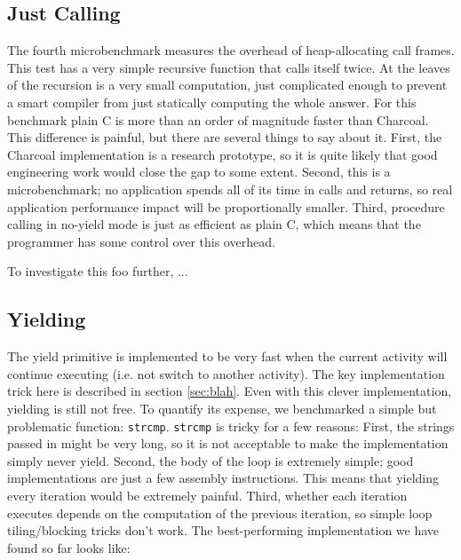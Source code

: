 \documentclass[10pt,preprint]{sigplanconf}
\begin{document}
\subsection{Just Calling}


The fourth microbenchmark measures the overhead of heap-allocating call frames.
This test has a very simple recursive function that calls itself twice.
At the leaves of the recursion is a very small computation, just complicated enough to prevent a smart compiler from just statically computing the whole answer.
For this benchmark plain C is more than an order of magnitude faster than Charcoal.
This difference is painful, but there are several things to say about it.
First, the Charcoal implementation is a research prototype, so it is quite likely that good engineering work would close the gap to some extent.
Second, this is a microbenchmark; no application spends all of its time in calls and returns, so real application performance impact will be proportionally smaller.
Third, procedure calling in no-yield mode is just as efficient as plain C, which means that the programmer has some control over this overhead.

To investigate this foo further, ...

\subsection{Yielding}

The yield primitive is implemented to be very fast when the current activity will continue executing (i.e. not switch to another activity).
The key implementation trick here is described in section \ref{sec:blah}.
Even with this clever implementation, yielding is still not free.
To quantify its expense, we benchmarked a simple but problematic function: \texttt{strcmp}.
\texttt{strcmp} is tricky for a few reasons:
First, the strings passed in might be very long, so it is not acceptable to make the implementation simply never yield.
Second, the body of the loop is extremely simple; good implementations are just a few assembly instructions.
This means that yielding every iteration would be extremely painful.
Third, whether each iteration executes depends on the computation of the previous iteration, so simple loop tiling/blocking tricks don't work.
The best-performing implementation we have found so far looks like:
\end{document}
